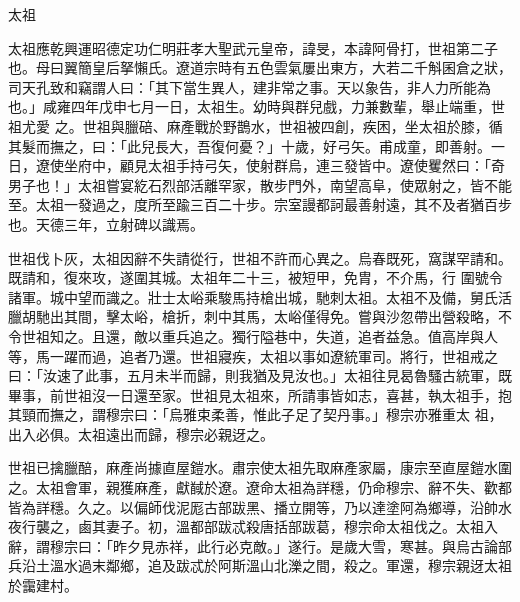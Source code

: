 
\begin{pinyinscope}

 太祖



 太祖應乾興運昭德定功仁明莊孝大聖武元皇帝，諱旻，本諱阿骨打，世祖第二子也。母曰翼簡皇后拏懶氏。遼道宗時有五色雲氣屢出東方，大若二千斛囷倉之狀，司天孔致和竊謂人曰：「其下當生異人，建非常之事。天以象告，非人力所能為也。」咸雍四年戊申七月一日，太祖生。幼時與群兒戲，力兼數輩，舉止端重，世祖尤愛
 之。世祖與臘碚、麻產戰於野鵲水，世祖被四創，疾困，坐太祖於膝，循其髮而撫之，曰：「此兒長大，吾復何憂？」十歲，好弓矢。甫成童，即善射。一日，遼使坐府中，顧見太祖手持弓矢，使射群烏，連三發皆中。遼使矍然曰：「奇男子也！」太祖嘗宴紇石烈部活離罕家，散步門外，南望高阜，使眾射之，皆不能至。太祖一發過之，度所至踰三百二十步。宗室謾都訶最善射遠，其不及者猶百步也。天德三年，立射碑以識焉。



 世祖伐卜灰，太祖因辭不失請從行，世祖不許而心異之。烏春既死，窩謀罕請和。既請和，復來攻，遂圍其城。太祖年二十三，被短甲，免胄，不介馬，行
 圍號令諸軍。城中望而識之。壯士太峪乘駿馬持槍出城，馳刺太祖。太祖不及備，舅氏活臘胡馳出其間，擊太峪，槍折，刺中其馬，太峪僅得免。嘗與沙忽帶出營殺略，不令世祖知之。且還，敵以重兵追之。獨行隘巷中，失道，追者益急。值高岸與人等，馬一躍而過，追者乃還。世祖寢疾，太祖以事如遼統軍司。將行，世祖戒之曰：「汝速了此事，五月未半而歸，則我猶及見汝也。」太祖往見曷魯騷古統軍，既畢事，前世祖沒一日還至家。世祖見太祖來，所請事皆如志，喜甚，執太祖手，抱其頸而撫之，謂穆宗曰：「烏雅束柔善，惟此子足了契丹事。」穆宗亦雅重太
 祖，出入必俱。太祖遠出而歸，穆宗必親迓之。



 世祖已擒臘醅，麻產尚據直屋鎧水。肅宗使太祖先取麻產家屬，康宗至直屋鎧水圍之。太祖會軍，親獲麻產，獻馘於遼。遼命太祖為詳穩，仍命穆宗、辭不失、歡都皆為詳穩。久之。以偏師伐泥厖古部跋黑、播立開等，乃以達塗阿為鄉導，沿帥水夜行襲之，鹵其妻子。初，溫都部跋忒殺唐括部跋葛，穆宗命太祖伐之。太祖入辭，謂穆宗曰：「昨夕見赤祥，此行必克敵。」遂行。是歲大雪，寒甚。與烏古論部兵沿土溫水過末鄰鄉，追及跋忒於阿斯溫山北濼之間，殺之。軍還，穆宗親迓太祖於靄建村。




\end{pinyinscope}
